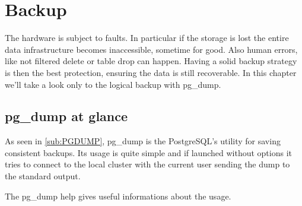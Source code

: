\chapter{Backup}
\label{cha:BACKUP}
The hardware is subject to faults. In particular if the storage is lost the entire data 
infrastructure becomes inaccessible, sometime for good. Also human errors, like not filtered 
delete or table drop can happen. Having a solid backup strategy is then the best protection, 
ensuring the data is still recoverable. In this chapter we'll take a look only to the logical 
backup with pg\_dump. 

\section{pg\_dump at glance}
\label{sec:PGDUMP}
As seen in \ref{sub:PGDUMP}, pg\_dump is the PostgreSQL's utility for saving 
consistent backups. 
Its usage is quite simple and if launched without options it tries to connect to the local cluster 
with the current user sending the dump to the standard output.\newline

The pg\_dump help gives useful informations about the usage.

